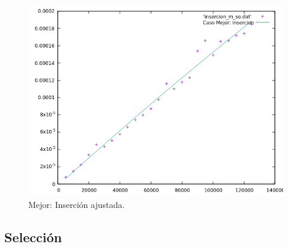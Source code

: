 \documentclass[a4paper,12pt,twoside]{article} %
\begin{document}
\begin{itemize}
\begin{figure}[h]
\begin{center}
  	\includegraphics[scale=0.8]{insercion_m_so_a.png}
  	\caption{Mejor: Inserción ajustada.}
  	
  \end{center}
\end{figure}
	
	\end{itemize}
\newpage

\subsection{Selección}
\end{document}
